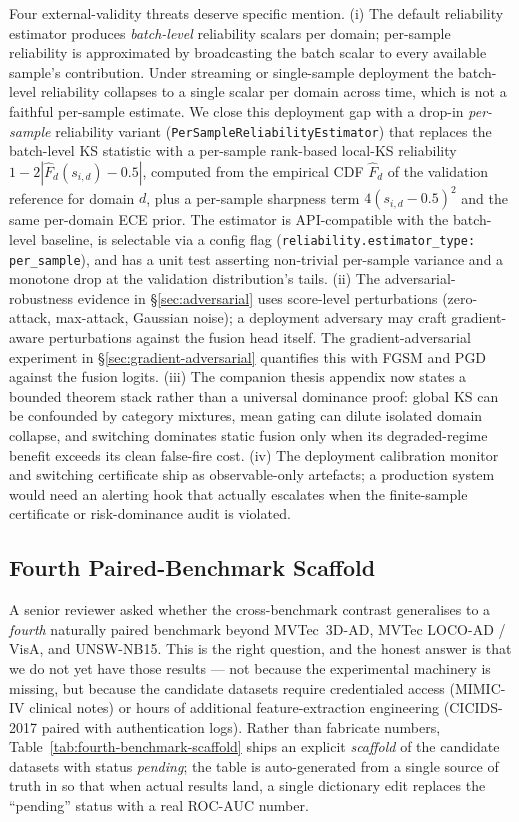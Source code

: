\documentclass[10pt,conference]{IEEEtran}
\begin{document}
Four external-validity threats deserve specific mention. (i) The
default reliability estimator produces \emph{batch-level} reliability
scalars per domain; per-sample reliability is approximated by
broadcasting the batch scalar to every available sample's
contribution. Under streaming or single-sample deployment the
batch-level reliability collapses to a single scalar per domain across
time, which is not a faithful per-sample estimate. We close this
deployment gap with a drop-in \emph{per-sample} reliability variant
(\texttt{PerSampleReliabilityEstimator}) that replaces the batch-level
KS statistic with a per-sample rank-based local-KS reliability
$1 - 2|\hat F_d(s_{i,d}) - 0.5|$, computed from the empirical CDF
$\hat F_d$ of the validation reference for domain $d$, plus a
per-sample sharpness term $4 (s_{i,d}-0.5)^2$ and the same
per-domain ECE prior. The estimator is API-compatible with the
batch-level baseline, is selectable via a config flag
(\texttt{reliability.estimator\_type: per\_sample}), and has a unit
test asserting non-trivial per-sample variance and a monotone drop at
the validation distribution's tails. (ii) The adversarial-robustness
evidence in §\ref{sec:adversarial} uses score-level perturbations
(zero-attack, max-attack, Gaussian noise); a deployment adversary may
craft gradient-aware perturbations against the fusion head itself. The
gradient-adversarial experiment in §\ref{sec:gradient-adversarial}
quantifies this with FGSM and PGD against the fusion logits. (iii) The
companion thesis appendix now states a bounded theorem stack rather than a
universal dominance proof: global KS can be confounded by category mixtures,
mean gating can dilute isolated domain collapse, and switching dominates static
fusion only when its degraded-regime benefit exceeds its clean false-fire cost.
(iv) The deployment
calibration monitor and switching certificate ship as observable-only
artefacts; a production system would need an alerting hook that
actually escalates when the finite-sample certificate or risk-dominance audit is
violated.

\subsection{Fourth Paired-Benchmark Scaffold}
\label{sec:fourth-benchmark-scaffold}

A senior reviewer asked whether the cross-benchmark contrast
generalises to a \emph{fourth} naturally paired benchmark beyond
MVTec~3D-AD, MVTec LOCO-AD / VisA, and UNSW-NB15. This is the right
question, and the honest answer is that we do not yet have those
results --- not because the experimental machinery is missing, but
because the candidate datasets require credentialed access (MIMIC-IV
clinical notes) or hours of additional feature-extraction engineering
(CICIDS-2017 paired with authentication logs). Rather than fabricate
numbers, Table~\ref{tab:fourth-benchmark-scaffold} ships an explicit
\emph{scaffold} of the candidate datasets with status
\emph{pending}; the table is auto-generated from a single source of
truth in  so that
when actual results land, a single dictionary edit replaces the
``pending'' status with a real ROC-AUC number.
\end{document}
